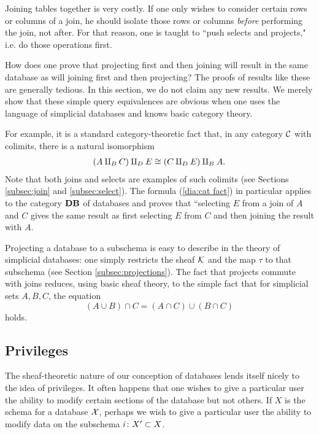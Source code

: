 \documentclass{amsart}
\def\Data{{\bf DB}}
\begin{document}
Joining tables together is very costly.  If one only wishes to consider certain rows or columns of a join, he should isolate those rows or columns {\em before} performing the join, not after.  For that reason, one is taught to ``push selects and projects," i.e. do those operations first.

How does one prove that projecting first and then joining will result in the same database as will joining first and then projecting?  The proofs of results like these are generally tedious.  In this section, we do not claim any new results.  We merely show that these simple query equivalences are obvious when one uses the language of simplicial databases and knows basic category theory. 

For example, it is a standard category-theoretic fact that, in any category $\mathcal{C}$ with colimits, there is a natural isomorphism \begin{eqnarray}\label{dia:cat fact}(A\amalg_BC)\amalg_DE\cong (C\amalg_DE)\amalg_BA.\end{eqnarray}  Note that both joins and selects are examples of such colimits (see Sections \ref{subsec:join} and \ref{subsec:select}).  The formula (\ref{dia:cat fact}) in particular applies to the category $\Data$ of databases and proves that ``selecting $E$ from a join of $A$ and $C$ gives the same result as first selecting $E$ from $C$ and then joining the result with $A$.

Projecting a database to a subschema is easy to describe in the theory of simplicial databases: one simply restricts the sheaf $\mathcal{K}$ and the map $\tau$ to that subschema (see Section \ref{subsec:projections}).  The fact that projects commute with joins reduces, using basic sheaf theory, to the simple fact that for simplicial sets $A,B,C$, the equation $$(A\cup B)\cap C=(A\cap C)\cup (B\cap C)$$ holds.  

\subsection{Privileges}\label{subsec:privileges}

The sheaf-theoretic nature of our conception of databases lends itself nicely to the idea of privileges.  It often happens that one wishes to give a particular user the ability to modify certain sections of the database but not others.  If $X$ is the schema for a database $\mathcal{X}$, perhaps we wish to give a particular user the ability to modify data on the subschema $i\colon X'\subset X$.  
\end{document}
